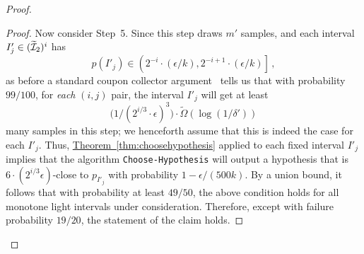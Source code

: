 \documentclass[10pt]{article}
\theoremstyle{definition}
\numberwithin{equation}{section}
\newcommand{\expref}[2]{\texorpdfstring{\hyperref[#2]{#1~\ref{#2}}}{#1~\ref{#2}}}
\newcommand{\algorithml}[1]{{\normalfont\texttt{#1}}}
\newcommand{\eps}{\epsilon}
\begin{document}
\begin{proof}
\begin{proof}
{Now consider Step~5.  Since this step draws $m'$ samples, and each
  interval $I'_j \in (\widetilde{{\cal I}}_2)^i$ has 
\[
p(I'_j) \in
  \left( 2^{-i} \cdot (\eps/k), 2^{-i+1} \cdot (\eps/k) \right]\,,
\]
as before a standard coupon collector argument~\cite{NS:60} tells us that with probability $99/100$, for \emph{each} $(i,j)$ pair, the interval $I'_j$ will get at least 
\[
\bigl(1/(2^{i/3} \cdot \eps)^3\bigr) \cdot \tilde{\Omega}(\log(1/\delta'))
\]
many samples in this step; we henceforth assume that this is indeed the case for each $I'_j$.  
Thus, \expref{Theorem}{thm:choosehypothesis} applied to each fixed interval $I'_j$ implies that the algorithm \algorithml{Choose-Hypothesis}}
will output a hypothesis that is ${6\cdot(2^{i/3} \eps)}$-close to $p_{I'_j}$ with probability $1-\eps/(500k)$.
By a union bound, it follows that with probability at least $49/50$,
the above condition holds for all monotone light intervals under consideration.
Therefore, except with failure probability $19/20$, the statement of the 
{claim} holds. 
\end{proof}


\end{proof}
\end{document}
